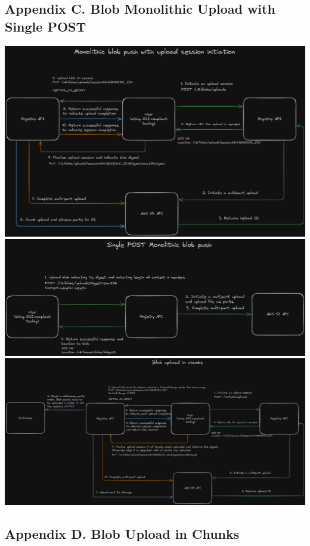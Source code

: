 \documentclass{article}
\begin{document}
  \subsection{Appendix C. Blob Monolithic Upload with Single POST}
  \label{sec:appendix-c}

  \includegraphics[scale=0.25]{appendix/blob-monolithic-upload-with-session.png}
  \includegraphics[scale=0.25]{appendix/blob-single-post-upload.png}
  \includegraphics[scale=0.20]{appendix/blob-upload-in-chunks.png}

  \subsection{Appendix D. Blob Upload in Chunks}
  \label{sec:appendix-d}
\end{document}
